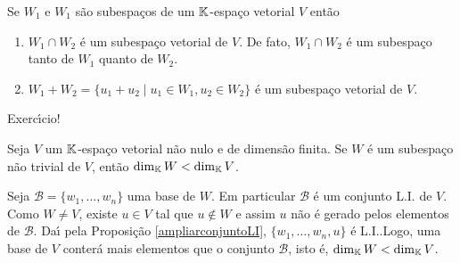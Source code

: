 \begin{proposicao}
	Se $W_1$ e $W_1$ s\~ao subespa\c{c}os de um $\mathbb{K}$-espa\c{c}o vetorial $V$ ent\~ao
	\begin{enumerate}[label={\alph*})]
		\item $W_1 \cap W_2$ \'e um subespa\c{c}o vetorial de $V$. De fato, $W_1 \cap W_2$ \'e um subespa\c{c}o tanto de $W_1$ quanto de $W_2$.
		\item $W_1 + W_2 = \{u_1 + u_2 \mid u_1 \in W_1, u_2 \in W_2\}$ \'e um subespa\c{c}o vetorial de $V$.
	\end{enumerate}
\end{proposicao}
\begin{prova}
	Exerc{\'\i}cio!
\end{prova}

\begin{proposicao}
	Seja $V$ um $\mathbb{K}$-espa\c{c}o vetorial n\~ao nulo e de dimens\~ao finita. Se $W$ \'e um subespa\c{c}o n\~ao trivial de $V$, ent\~ao $\dim_{\mathbb{K}} W < \dim_{\mathbb{K}} V$.
\end{proposicao}
\begin{prova}
	Seja $\mathcal{B} = \{w_1, \dots,w_n\}$ uma base de $W$. Em particular $\mathcal{B}$ \'e um conjunto L.I. de $V$. Como $W \ne V$, existe $u \in V$ tal que $u \notin W$ e assim $u$ n\~ao \'e gerado pelos elementos de $\mathcal{B}$. Da{\'\i} pela Proposi\c{c}\~ao \ref{ampliarconjuntoLI}, $\{w_1, \dots,w_n,u\}$ \'e L.I..Logo, uma base de $V$ conter\'a mais elementos que o conjunto $\mathcal{B}$, isto \'e, $\dim_{\mathbb{K}} W < \dim_{\mathbb{K}} V$.
\end{prova}

